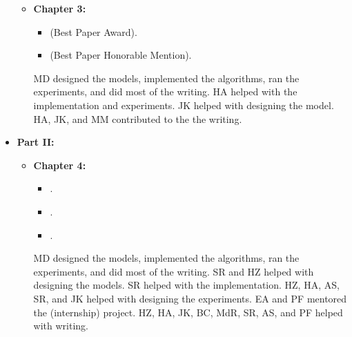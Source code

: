 \begin{itemize}
\begin{itemize}
    
            \item[]\textbf{Chapter 3:} \emph{}
            \begin{itemize}[label=\textbullet] 
                \item {} (Best Paper Award).
                \item {} (Best Paper Honorable Mention).
            \end{itemize}
            {\footnotesize{MD designed the models, implemented the algorithms, ran the experiments, and did most of the writing. HA helped with the implementation and experiments. JK helped with designing the model. HA, JK, and MM contributed to the the writing.}\medskip}
        \end{itemize}
%  
    \item[] \textbf{Part II:} \emph{}
%  
        \begin{itemize}
            \setlength{\itemindent}{-33pt}
            \item[] \textbf{Chapter 4:} \emph{}
            \begin{itemize}[label=\textbullet] 
                \item {}.
                \item {}.
                \item {}.
            \end{itemize}
            {\footnotesize{MD designed the models, implemented the algorithms, ran the experiments, and did most of the writing. 
            SR and HZ helped with designing the models. SR helped with the implementation. HZ, HA, AS, SR, and JK helped with designing the experiments. EA and PF mentored the (internship) project. HZ, HA, JK, BC, MdR, SR, AS, and PF helped with writing.}\medskip}
                        

\end{itemize}
\end{itemize}
